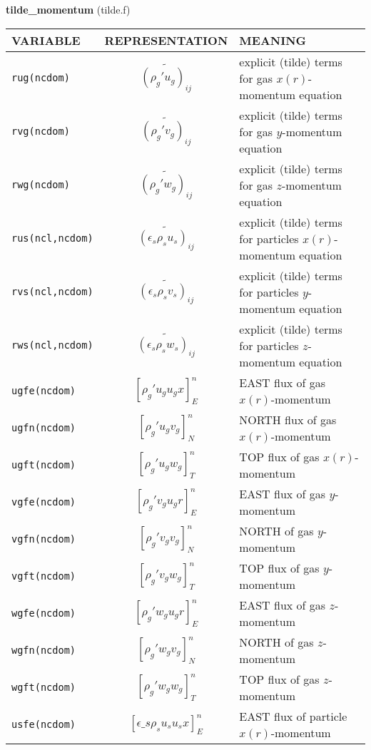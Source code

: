 %
%
{\large{\bf tilde\_momentum}} (tilde.f)\\[5mm]
\begin{tabular}{|p{4cm}|c|p{8cm}|}\hline
VARIABLE & REPRESENTATION & MEANING\\\hline
\tt rug(ncdom)& $\widetilde{(\rho_g'u_g)_{ij}}$ &explicit (tilde) terms for gas $x(r)$-mo\-men\-tum equation\\\hline
\tt rvg(ncdom)& $\widetilde{(\rho_g'v_g)_{ij}}$ &explicit (tilde) terms for gas $y$-mo\-men\-tum equation\\\hline
\tt rwg(ncdom)& $\widetilde{(\rho_g'w_g)_{ij}}$ &explicit (tilde) terms for gas $z$-mo\-men\-tum equation\\\hline
\tt rus(ncl,ncdom)& $\widetilde{(\epsilon_s\rho_su_s)_{ij}}$ &explicit (tilde) terms for particles $x(r)$-mo\-men\-tum equation\\\hline
\tt rvs(ncl,ncdom)& $\widetilde{(\epsilon_s\rho_sv_s)_{ij}}$ &explicit (tilde) terms for particles $y$-mo\-men\-tum equation\\\hline
\tt rws(ncl,ncdom)& $\widetilde{(\epsilon_s\rho_sw_s)_{ij}}$ &explicit (tilde) terms for particles $z$-mo\-men\-tum equation\\\hline
\tt ugfe(ncdom) & $\left[ \rho_g' u_g u_g x \right]_{E}^n$ & EAST flux of gas $x(r)$-momentum \\\hline 
\tt ugfn(ncdom) & $\left[ \rho_g' u_g v_g \right]_{N}^n$ & NORTH flux of gas $x(r)$-momentum \\\hline
\tt ugft(ncdom) & $\left[ \rho_g' u_g w_g \right]_{T}^n$ & TOP flux of gas $x(r)$-momentum \\\hline
\tt vgfe(ncdom) & $\left[ \rho_g' v_g u_g r \right]_{E}^n$ & EAST flux of gas $y$-momentum \\\hline
\tt vgfn(ncdom) & $\left[ \rho_g' v_g v_g \right]_{N}^n$ & NORTH of gas $y$-momentum \\\hline
\tt vgft(ncdom) & $\left[ \rho_g' v_g w_g \right]_{T}^n$ & TOP flux of gas $y$-momentum \\\hline
\tt wgfe(ncdom) & $\left[ \rho_g' w_g u_g r \right]_{E}^n$ & EAST flux of gas $z$-momentum \\\hline
\tt wgfn(ncdom) & $\left[ \rho_g' w_g v_g \right]_{N}^n$ & NORTH of gas $z$-momentum \\\hline
\tt wgft(ncdom) & $\left[ \rho_g' w_g w_g \right]_{T}^n$ & TOP flux of gas $z$-momentum \\\hline
\tt usfe(ncdom) & $\left[ \epsilon\_s\rho_s u_s u_s x \right]_{E}^n$ & EAST flux of particle $x(r)$-momentum \\\hline 

\end{tabular}
